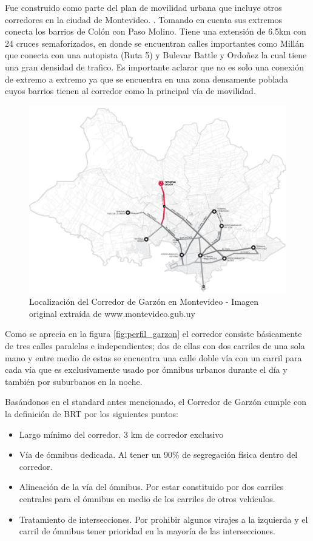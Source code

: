 Fue construido como parte del plan de movilidad urbana que incluye otros corredores en la ciudad de Montevideo. \citep{PlanMovilidad}. Tomando en cuenta sus extremos conecta los barrios de Colón con Paso Molino. Tiene una extensión de 6.5km con 24 cruces semaforizados, en donde se encuentran calles importantes como Millán que conecta con una autopista (Ruta 5) y Bulevar Battle y Ordoñez la cual tiene una gran densidad de trafico. Es importante aclarar que no es solo una conexión de extremo a extremo ya que se encuentra en una zona densamente poblada cuyos barrios tienen al corredor como la principal vía de movilidad.

\begin{figure}[H]
	\centering
	\includegraphics[width=0.7\linewidth]{Figures/Mapa_Garzon_0}
	\caption{Localización del Corredor de Garzón en Montevideo - Imagen original extraída de www.montevideo.gub.uy		
	}
	\label{fig:Grafica de costos de otros medios de transporte}
\end{figure}

Como se aprecia en la figura \ref{fig:perfil_garzon} el corredor consiste básicamente de tres calles paralelas e independientes; dos de ellas con dos carriles de una sola mano y entre medio de estas se encuentra una calle doble vía con un carril para cada vía que es exclusivamente usado por ómnibus urbanos durante el día y también por suburbanos en la noche.


Basándonos en el standard antes mencionado, el Corredor de Garzón cumple con la definición de BRT por los siguientes puntos:
\begin{itemize}
	\item Largo mínimo del corredor. 3 km de corredor exclusivo 
	\item Vía de ómnibus dedicada. Al tener un 90\% de segregación física dentro del corredor.
	\item Alineación de la vía del ómnibus. Por estar constituido por dos carriles centrales para el ómnibus en medio de los carriles de otros vehículos.
	\item Tratamiento de intersecciones. Por prohibir algunos virajes a la izquierda y el carril de ómnibus tener prioridad en la mayoría de las intersecciones.
\end{itemize}


